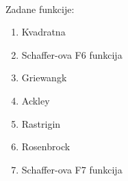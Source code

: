 \documentclass[times, utf8, zavrsni, numeric]{fer}
\begin{document}
\paragraph{}
Zadane funkcije:
\begin{enumerate}
\item Kvadratna
\item Schaffer-ova F6 funkcija
\item Griewangk
\item Ackley
\item Rastrigin
\item Rosenbrock
\item Schaffer-ova F7 funkcija
\end{enumerate}

\clearpage
\end{document}
